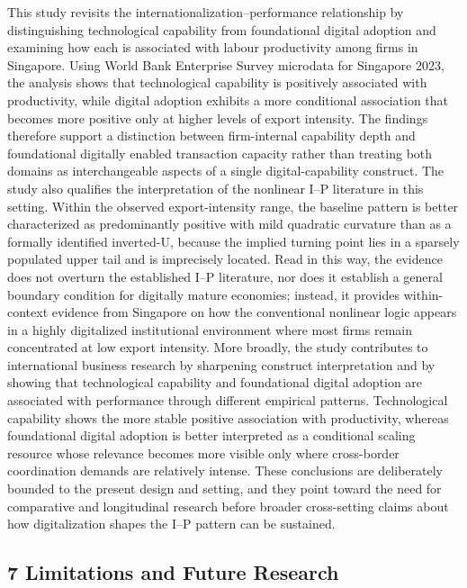 \documentclass[12pt,a4paper]{article}
\begin{document}
This study revisits the internationalization--performance relationship
by distinguishing technological capability from foundational digital
adoption and examining how each is associated with labour productivity
among firms in Singapore. Using World Bank Enterprise Survey microdata
for Singapore 2023, the analysis shows that technological capability is
positively associated with productivity, while digital adoption exhibits
a more conditional association that becomes more positive only at higher
levels of export intensity. The findings therefore support a distinction
between firm-internal capability depth and foundational digitally
enabled transaction capacity rather than treating both domains as
interchangeable aspects of a single digital-capability construct. The
study also qualifies the interpretation of the nonlinear I--P literature
in this setting. Within the observed export-intensity range, the
baseline pattern is better characterized as predominantly positive with
mild quadratic curvature than as a formally identified inverted-U,
because the implied turning point lies in a sparsely populated upper
tail and is imprecisely located. Read in this way, the evidence does not
overturn the established I--P literature, nor does it establish a
general boundary condition for digitally mature economies; instead, it
provides within-context evidence from Singapore on how the conventional
nonlinear logic appears in a highly digitalized institutional
environment where most firms remain concentrated at low export
intensity. More broadly, the study contributes to international business
research by sharpening construct interpretation and by showing that
technological capability and foundational digital adoption are
associated with performance through different empirical patterns.
Technological capability shows the more stable positive association with
productivity, whereas foundational digital adoption is better
interpreted as a conditional scaling resource whose relevance becomes
more visible only where cross-border coordination demands are relatively
intense. These conclusions are deliberately bounded to the present
design and setting, and they point toward the need for comparative and
longitudinal research before broader cross-setting claims about how
digitalization shapes the I--P pattern can be sustained.

\hypertarget{7-limitations-and-future-research}{%
\subsection{7 Limitations and Future
Research}\label{7-limitations-and-future-research}}
\end{document}
